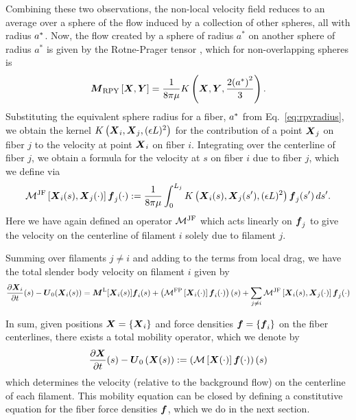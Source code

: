 Combining these two observations, the non-local velocity field reduces to an average over a sphere of the flow induced by a collection of other spheres, all with radius $a^*$. Now, the flow created by a sphere of radius $a^*$ on another sphere of radius $a^*$ is given by the Rotne-Prager tensor \cite{rpyOG, PSRPY}, which for non-overlapping spheres is
\begin{equation}
\boldsymbol{M}_\text{RPY}\left[\boldsymbol{X},\boldsymbol{Y}\right] = \frac{1}{8\pi\mu} K\left(\boldsymbol{X},\boldsymbol{Y},\frac{2{\left(a^*\right)}^2}{3}\right). 
\end{equation}
Substituting the equivalent sphere radius for a fiber, $a^*$ from Eq.\ \eqref{eq:rpyradius}, we obtain the kernel $K\left({\boldsymbol{X}}_{i},{\boldsymbol{X}}_{j},(\epsilon L)^2\right)$ for the contribution of a point ${\boldsymbol{X}}_{j}$ on fiber $j$ to the velocity at point ${\boldsymbol{X}}_{i}$ on fiber $i$. Integrating over the centerline of fiber $j$, we obtain a formula for the velocity at $s$ on fiber $i$ due to fiber $j$, which we define via
\begin{equation}
\label{eq:sbtother}
\mathcal{M}^\text{JF}\left[\boldsymbol{X}_i(s), \boldsymbol{X}_j(\cdot)\right]{\boldsymbol{f}}_{j}(\cdot) := \frac{1}{8\pi\mu} \int_0^{L_j} K\left({\boldsymbol{X}}_{i}(s),{\boldsymbol{X}}_{j}(s'),(\epsilon L)^2\right){\boldsymbol{f}}_{j}(s') \, ds'. 
\end{equation}
Here we have again defined an operator $\mathcal{M}^\text{JF}$ which acts linearly on ${\boldsymbol{f}}_{j}$ to give the velocity on the centerline of filament $i$ solely due to filament $j$. 

Summing over filaments $j \neq i$ and adding to the terms from local drag, we have the total slender body velocity on filament $i$ given by
\begin{equation}
\label{eq:fibevcont}
\frac{\partial {\boldsymbol{X}}_{i}}{\partial t}(s) -\boldsymbol{U}_0({\boldsymbol{X}}_{i}(s))=  \boldsymbol{M}^\text{L} [{\boldsymbol{X}}_{i}(s)]{\boldsymbol{f}}_{i}(s) + \left(\mathcal{M}^\text{FP}\left[{\boldsymbol{X}}_{i}(\cdot)\right]{\boldsymbol{f}}_{i}(\cdot)\right)(s) + \sum_{j \neq i}\mathcal{M}^\text{JF}\left[\boldsymbol{X}_i(s), \boldsymbol{X}_j(\cdot)\right]{\boldsymbol{f}}_{j}(\cdot)
\end{equation}

In sum, given positions $\boldsymbol{X}=\{{\boldsymbol{X}}_{i}\}$ and force densities $\boldsymbol{f}=\{{\boldsymbol{f}}_{i}\}$ on the fiber centerlines, there exists a total mobility operator, which we denote by
\begin{equation}
\label{eq:mobeqn}
 \frac{\partial \boldsymbol{X}}{\partial t}(s)-\boldsymbol{U}_0\left(\boldsymbol{X}(s)\right) := \left(\mathcal{M}\left[\boldsymbol{X}(\cdot)\right]\boldsymbol{f}(\cdot)\right)(s)
\end{equation}
which determines the velocity (relative to the background flow) on the centerline of each filament. This mobility equation can be closed by defining a constitutive equation for the fiber force densities $\boldsymbol{f}$, which we do in the next section.


